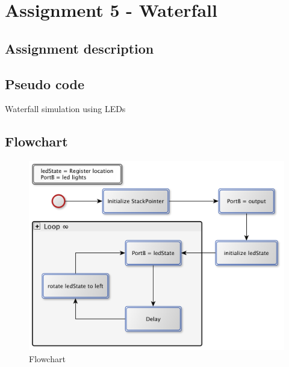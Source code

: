 \documentclass[a4paper, 12pt]{article}
\begin{document}
\section{Assignment 5 - Waterfall}

\subsection{Assignment description}


\subsection{Pseudo code}
\begin{algorithm}
\begin{algorithmic}
 
\Repeat
{}
\Until{$\infty$}
\EndProcedure
\caption{Waterfall simulation using LEDs}
\label{}
\end{algorithmic}
\end{algorithm}

\subsection{Flowchart}
\begin{figure}[h]
\centering
\includegraphics[scale=0.5]{Flowchart_pics/assignment5_pic.png} 
\caption{Flowchart}
\label{}
\end{figure}
\end{document}
